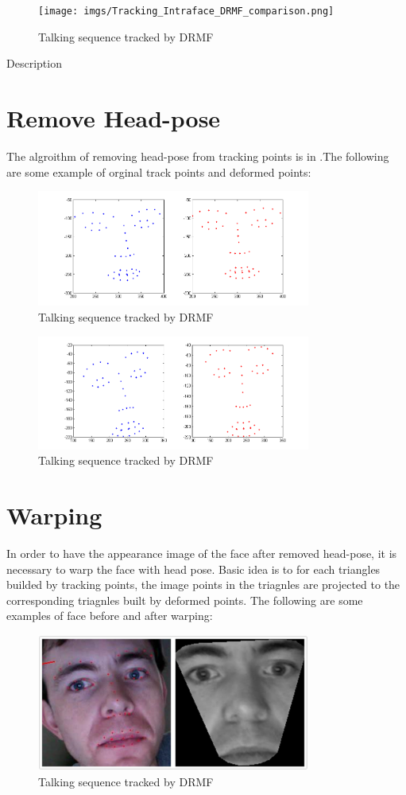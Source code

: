 \begin{figure}[ht!]
\centering
\texttt{[image: imgs/Tracking\_Intraface\_DRMF\_comparison.png]}
\caption{Talking sequence tracked by DRMF}
\end{figure}

Description
\section{Remove Head-pose}
The algroithm of removing head-pose from tracking points is in \cite{saragih2011deformable}.The following are some example of orginal track points and deformed points:

\begin{figure}[ht!]
\centering
\includegraphics[width=90mm]{imgs/160954_Deform_213.png}
\caption{Talking sequence tracked by DRMF}
\end{figure}

\begin{figure}[ht!]
\centering
\includegraphics[width=90mm]{imgs/160954_Deform_233.png}
\caption{Talking sequence tracked by DRMF}
\end{figure}

\section{Warping}
In order to have the appearance image of the face after removed head-pose, it is necessary to warp the face with head pose. Basic idea is to for each triangles builded by tracking points, the image points in the triagnles are projected to the corresponding triagnles built by deformed points. The following are some examples of face before and after warping:

\begin{figure}[ht!]
\centering
\includegraphics[width=90mm]{imgs/Warping_Intraface_213.png}
\caption{Talking sequence tracked by DRMF}
\end{figure}

